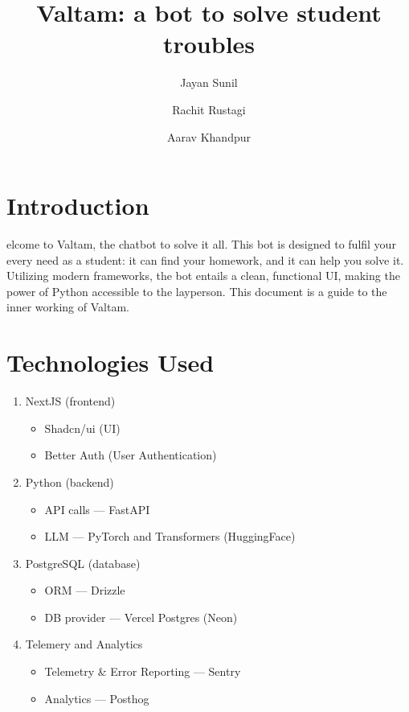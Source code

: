 \documentclass[9pt,a4paper,twocolumn,twoside]{tau-class/tau}
\title{Valtam: a bot to solve student troubles}
\author[a]{Jayan Sunil}
\author[b]{Rachit Rustagi}
\author[c]{Aarav Khandpur}
\affil[a]{IX --- Everest, +91 9910856655}
\affil[b]{IX --- Nilgiris, +91 9211450648}
\affil[c]{IX --- Nilgiris, +91 9211612568}
\begin{document}
\maketitle
\thispagestyle{firststyle}
\tauabstract
\tableofcontents


\section{Introduction}

elcome to Valtam, the chatbot to solve it all. This bot is designed to fulfil your every need as a student: it can find your homework, and it can help you solve it. Utilizing modern frameworks, the bot entails a clean, functional UI, making the power of Python accessible to the layperson. This document is a guide to the inner working of Valtam.


\section{Technologies Used}
\begin{enumerate}
	\item NextJS (frontend)
	      \begin{itemize}
		      \item Shadcn/ui (UI)
		      \item Better Auth (User Authentication)
	      \end{itemize}
	\item Python (backend)
	      \begin{itemize}
		      \item API calls --- FastAPI
		      \item LLM --- PyTorch and Transformers (HuggingFace)
	      \end{itemize}
	\item PostgreSQL (database)
	      \begin{itemize}
		      \item ORM --- Drizzle
		      \item DB provider --- Vercel Postgres (Neon)
	      \end{itemize}
	\item Telemery and Analytics
	      \begin{itemize}
		      \item Telemetry \& Error Reporting --- Sentry
		      \item Analytics --- Posthog
	      \end{itemize}
\end{enumerate}
\end{document}
